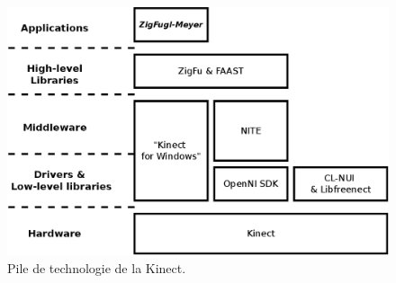 \begin{figure}[h!]
\centering
\includegraphics[width=0.9\linewidth]{images/technology_overview}
\caption{Pile de technologie de la Kinect.}
\label{fig:technology_overview}
\end{figure}